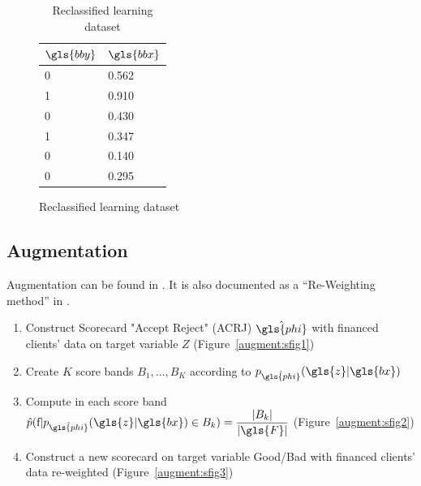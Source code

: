 \begin{table}
{\begin{multicols}{3}
\begin{subfigure}[t]{0.31\textwidth}
\begin{center}
\begin{adjustbox}{max width=\textwidth}
\begin{tabular}{l l}
\toprule
\textbf{${\gls{bby}}$} & \textbf{${\gls{bbx}}$}\\
\midrule
0 & 0.562 \\
1 & 0.910 \\
0 & 0.430 \\
1 & 0.347 \\
0 & 0.140 \\
0 & 0.295 \\
\bottomrule
\end{tabular}
\end{adjustbox}
\end{center}
\caption{Reclassified learning dataset}
\label{reclass:sfig3}
\end{subfigure}

\end{multicols}
}
\end{table}


\subsection{Augmentation} \label{augmentation}

Augmentation can be found in \cite{RI6}. It is also documented as a ``Re-Weighting method'' in \cite{saporta,banasik,economix}.

\begin{enumerate}
\item Construct Scorecard "Accept Reject" (ACRJ) $\hat{\gls{phi}}$ with financed clients' data on target variable $Z$ (Figure~\ref{augment:sfig1})
\item Create $K$ score bands $B_1, \ldots, B_K$ according to $p_{\hat{\gls{phi}}}(\gls{z} | \gls{bx})$
\item Compute in each score band $\hat{p}(\text{f}|p_{\hat{\gls{phi}}}(\gls{z} | \gls{bx}) \in B_k) = \dfrac{|B_k|}{|\gls{F}|}$ (Figure~\ref{augment:sfig2})
\item Construct a new scorecard on target variable Good/Bad with financed clients' data re-weighted (Figure~\ref{augment:sfig3})
\end{enumerate}

